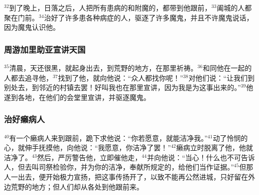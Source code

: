 $^{32}$到了晚上，日落之后，人把所有患病的和附魔的，都带到他跟前，$^{33}$阖城的人都聚在门前。$^{34}$\UL[耶稣]治好了许多患各种病症的人，驱逐了许多魔鬼，并且不许魔鬼说话，因为魔鬼认识他。


\subsubsection{周游加里助亚宣讲天国}
$^{35}$清晨，天还很黑，\UL[耶稣]就起身出去，到荒野的地方，在那里祈祷。$^{36}$\UL[西满]和同他在一起的人都去追寻他，$^{37}$找到了他，就向他说：“众人都找你呢！”$^{38}$\UL[耶稣]对他们说：“让我们到别处去，到邻近的村镇去罢！好叫我也在那里宣讲，因为我是为这事出来的。”$^{39}$他遂到\UL[加里肋亚]各地，在他们的会堂里宣讲，并驱逐魔鬼。


\subsubsection{治好癞病人}
$^{40}$有一个癞病人来到\UL[耶稣]跟前，跪下求他说：“你若愿意，就能洁净我。”$^{41}$\UL[耶稣]动了怜悯的心，就伸手抚摸他，向他说：“我愿意，你洁净了罢！”$^{42}$癞病立时脱离了他，他就洁净了。$^{43}$然后，\UL[耶稣]严厉警告他，立即催他走，$^{44}$并向他说：“当心！什么也不可告诉人，但去叫司祭检验你，并为你的洁净，奉献\UL[梅瑟]所规定的，给他们当作证据。”$^{45}$但那人一出去，便开始极力宣扬，把这事传扬开了，以致\UL[耶稣]不能再公然进城，只好留在外边荒野的地方；但人们却从各处到他跟前来。